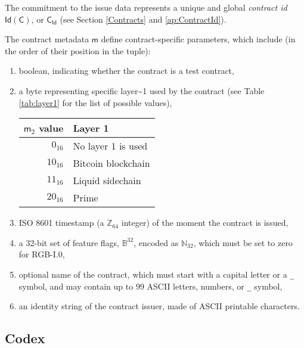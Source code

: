 \documentclass[9pt,oneside]{amsart}
\newenvironment{coltable}
  {\par\bigskip\noindent\minipage{\columnwidth}\centering}
  {\endminipage\par\bigskip}
\begin{document}
\newpage
\begin{multicols}{2}

The commitment to the \gls{issue} data represents a unique and global \emph{contract id}
$\mathsf{Id}(\mathsf{C})$, or $\mathsf{C_{Id}}$ (see Section \ref{Contracts} and \ref{ap:ContractId}).

The contract metadata $\mathsf{m}$ define contract-specific parameters, which include
(in the order of their position in the tuple):

\begin{enumerate}
\item boolean, indicating whether the contract is a test contract,
\item a byte representing specific \gls{layer~1} used by the contract
  (see Table \ref{tab:layer1} for the list of possible values),

\begin{coltable}
\label{tab:layer1}
\begin{tabular}{r l}
\toprule
$\mathsf{m}_2$ value & Layer 1 \\
\midrule
$0_{16}$ & No layer 1 is used \\
$10_{16}$ & Bitcoin blockchain \cite{Bitcoin} \\
$11_{16}$ & Liquid sidechain \cite{Liquid} \\
$20_{16}$ & Prime \cite{Prime} \\
\bottomrule
\end{tabular}
\end{coltable}

\item ISO 8601 timestamp (a $\mathbb{Z}_{64}$ integer) of the moment the contract is issued,
\item a 32-bit set of feature flags, $\mathbb{B}^{32}$, encoded as $\mathbb{N}_{32}$,
  which must be set to zero for RGB-I.0,
\item optional name of the contract, which must start with a capital letter or a \texttt{\_} symbol,
  and may contain up to 99 ASCII letters, numbers, or \texttt{\_} symbol,
\item an identity string of the contract issuer, made of ASCII printable characters.
\end{enumerate}

\subsection{Codex}\label{Codex}


\end{multicols}
\end{document}
